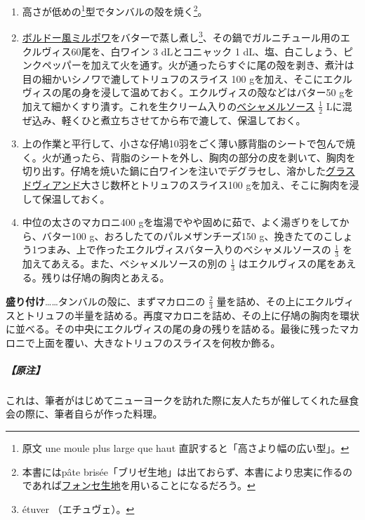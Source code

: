 
\begin{enumerate}
\def\labelenumi{\arabic{enumi}.}
\item
  高さが低めの\footnote{原文 une moule plus large que haut
    直訳すると「高さより幅の広い型」。}型でタンバルの殻を焼く\footnote{本書にはpâte
    brisée「ブリゼ生地」は出ておらず、本書により忠実に作るのであれば\protect\hyperlink{pate-a-foncer}{フォンセ生地}を用いることになるだろう。}。
\item
  \protect\hyperlink{mirepoix-fine}{ボルドー風ミルポワ}をバターで蒸し煮し\footnote{étuver
    （エチュヴェ）。}、その鍋でガルニチュール用のエクルヴィス60尾を、白ワイン
  3 dLとコニャック 1
  dL、塩、白こしょう、ピンクペッパーを加えて火を通す。火が通ったらすぐに尾の殻を剥き、煮汁は目の細かいシノワで漉してトリュフのスライス
  100
  gを加え、そこにエクルヴィスの尾の身を浸して温めておく。エクルヴィスの殻などはバター50
  gを加えて細かくすり潰す。これを生クリーム入りの\protect\hyperlink{sauce-bechamel}{ベシャメルソース}
  \(\frac{1}{2}\)
  Lに混ぜ込み、軽くひと煮立ちさせてから布で漉して、保温しておく。
\item
  上の作業と平行して、小さな仔鳩10羽をごく薄い豚背脂のシートで包んで焼く。火が通ったら、背脂のシートを外し、胸肉の部分の皮を剥いて、胸肉を切り出す。仔鳩を焼いた鍋に白ワインを注いでデグラセし、溶かした\protect\hyperlink{glace-de-viande}{グラスドヴィアンド}大さじ数杯とトリュフのスライス100
  gを加え、そこに胸肉を浸して保温しておく。
\item
  中位の太さのマカロニ400
  gを塩湯でやや固めに茹で、よく湯ぎりをしてから、バター100
  g、おろしたてのパルメザンチーズ150
  g、挽きたてのこしょう1つまみ、上で作ったエクルヴィスバター入りのベシャメルソースの
  \(\frac{1}{3}\) を加えてあえる。また、ベシャメルソースの別の
  \(\frac{1}{3}\) はエクルヴィスの尾をあえる。残りは仔鳩の胸肉とあえる。
\end{enumerate}

\textbf{盛り付け}\ldots{}\ldots{}タンバルの殻に、まずマカロニの
\(\frac{2}{3}\)
量を詰め、その上にエクルヴィスとトリュフの半量を詰める。再度マカロニを詰め、その上に仔鳩の胸肉を環状に並べる。その中央にエクルヴィスの尾の身の残りを詰める。最後に残ったマカロニで上面を覆い、大きなトリュフのスライスを何枚か飾る。

\hypertarget{ux539fux6ce8}{%
\subparagraph{【原注】}\label{ux539fux6ce8}}

これは、筆者がはじめてニューヨークを訪れた際に友人たちが催してくれた昼食会の際に、筆者自らが作った料理。

